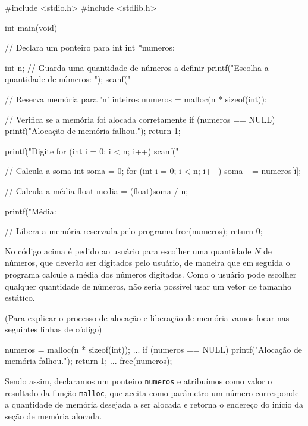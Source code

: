 \begin{excode}
    #include <stdio.h>
    #include <stdlib.h>

    int main(void)
    {
        // Declara um ponteiro para int
        int *numeros;
        
        int n; // Guarda uma quantidade de números a definir
        printf("Escolha a quantidade de números: ");
        scanf("%
        
        // Reserva memória para 'n' inteiros
        numeros = malloc(n * sizeof(int));
        
        // Verifica se a memória foi alocada corretamente
        if (numeros == NULL) {
            printf("Alocação de memória falhou.\n");
            return 1;
        }
        
        printf("Digite %
        for (int i = 0; i < n; i++) {
            scanf("%
        }
        
        // Calcula a soma
        int soma = 0;
        for (int i = 0; i < n; i++) {
            soma += numeros[i];
        }
        
        // Calcula a média
        float media = (float)soma / n;
        
        printf("Média: %
        
        // Libera a memória reservada pelo programa
        free(numeros);
        return 0;
    }
\end{excode}

No código acima é pedido ao usuário para escolher uma quantidade \(N\) de 
números, que deverão ser digitados pelo usuário, de maneira que em seguida o 
programa calcule a média dos números digitados. Como o usuário pode escolher 
qualquer quantidade de números, não seria possível usar um vetor de tamanho 
estático.

(Para explicar o processo de alocação e liberação de memória vamos focar nas 
seguintes linhas de código)

\begin{excode}
    numeros = malloc(n * sizeof(int));
    ...
    if (numeros == NULL) {
        printf("Alocação de memória falhou.\n");
        return 1;
    }
    ...
    free(numeros);
\end{excode}

Sendo assim, declaramos um ponteiro \texttt{numeros} e atribuímos como valor o 
resultado da  função \texttt{malloc}, que aceita como parâmetro um número 
corresponde a quantidade de memória desejada a ser alocada e retorna o endereço 
do início da seção de memória alocada.

